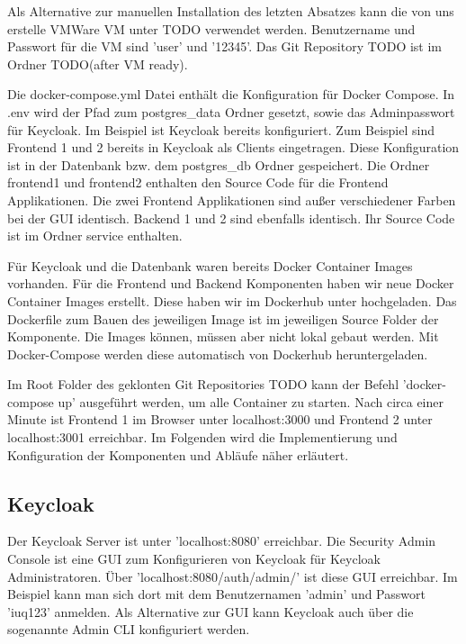 Als Alternative zur manuellen Installation des letzten Absatzes kann die von uns erstelle VMWare VM unter TODO verwendet werden. Benutzername und Passwort für die VM sind 'user' und '12345'. Das Git Repository TODO ist im Ordner TODO(after VM ready).

Die docker-compose.yml Datei enthält die Konfiguration für Docker Compose. In .env wird der Pfad zum postgres\_data Ordner gesetzt, sowie das Adminpasswort für Keycloak. Im Beispiel ist Keycloak bereits konfiguriert. Zum Beispiel sind Frontend 1 und 2 bereits in Keycloak als Clients eingetragen. Diese Konfiguration ist in der Datenbank bzw. dem postgres\_db Ordner gespeichert. Die Ordner frontend1 und frontend2 enthalten den Source Code für die Frontend Applikationen. Die zwei Frontend Applikationen sind außer verschiedener Farben bei der GUI identisch. Backend 1 und 2 sind ebenfalls identisch. Ihr Source Code ist im Ordner service enthalten. 

Für Keycloak und die Datenbank waren bereits Docker Container Images vorhanden. Für die Frontend und Backend Komponenten haben wir neue Docker Container Images erstellt. Diese haben wir im Dockerhub unter \cite{EB42} hochgeladen. Das Dockerfile zum Bauen des jeweiligen Image ist im jeweiligen Source Folder der Komponente. Die Images können, müssen aber nicht lokal gebaut werden. Mit Docker-Compose werden diese automatisch von Dockerhub heruntergeladen.

Im Root Folder des geklonten Git Repositories TODO kann der Befehl 'docker-compose up' ausgeführt werden, um alle Container zu starten. Nach circa einer Minute ist Frontend 1 im Browser unter localhost:3000 und Frontend 2 unter localhost:3001 erreichbar. Im Folgenden wird die Implementierung und Konfiguration der Komponenten und Abläufe näher erläutert.

\subsection{Keycloak}

Der Keycloak Server ist unter 'localhost:8080' erreichbar. Die Security Admin Console ist eine GUI zum Konfigurieren von Keycloak für Keycloak Administratoren. Über 'localhost:8080/auth/admin/' ist diese GUI erreichbar. Im Beispiel kann man sich dort mit dem Benutzernamen 'admin' und Passwort 'iuq123' anmelden. Als Alternative zur GUI kann Keycloak auch über die sogenannte Admin CLI konfiguriert werden.

